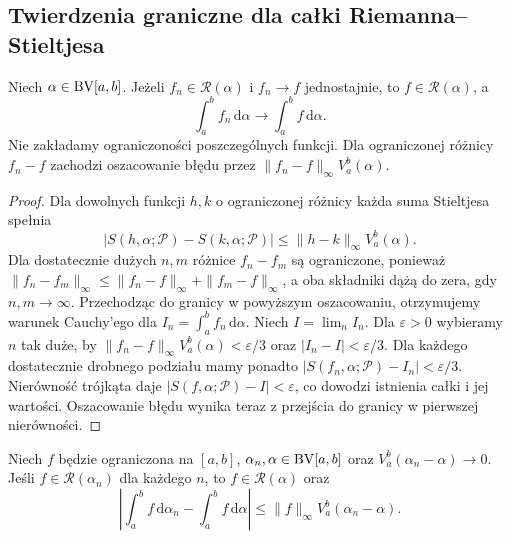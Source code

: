 \subsection{Twierdzenia graniczne dla całki Riemanna--Stieltjesa}
\begin{twierdzenie}\label{ma1:kh:thm:rs-uniform}
Niech $\alpha\in\mathrm{BV}[a,b]$. Jeżeli $f_n\in\mathcal R(\alpha)$ i $f_n\to f$ jednostajnie, to $f\in\mathcal R(\alpha)$, a
\[
 \int_a^b f_n\,\mathrm d\alpha\longrightarrow\int_a^b f\,\mathrm d\alpha.
\]
Nie zakładamy ograniczoności poszczególnych funkcji. Dla ograniczonej różnicy $f_n-f$ zachodzi oszacowanie błędu przez $\|f_n-f\|_\infty V_a^b(\alpha)$.
\end{twierdzenie}
\begin{proof}
Dla dowolnych funkcji $h,k$ o ograniczonej różnicy każda suma Stieltjesa spełnia
\[
 |S(h,\alpha;\mathcal P)-S(k,\alpha;\mathcal P)|
 \le\|h-k\|_\infty V_a^b(\alpha).
\]
Dla dostatecznie dużych $n,m$ różnice $f_n-f_m$ są ograniczone, ponieważ $\|f_n-f_m\|_\infty\le\|f_n-f\|_\infty+\|f_m-f\|_\infty$, a oba składniki dążą do zera, gdy $n,m\to\infty$. Przechodząc do granicy w powyższym oszacowaniu, otrzymujemy warunek Cauchy'ego dla $I_n=\int_a^b f_n\,\mathrm d\alpha$. Niech $I=\lim_n I_n$. Dla $\varepsilon>0$ wybieramy $n$ tak duże, by $\|f_n-f\|_\infty V_a^b(\alpha)<\varepsilon/3$ oraz $|I_n-I|<\varepsilon/3$. Dla każdego dostatecznie drobnego podziału mamy ponadto $|S(f_n,\alpha;\mathcal P)-I_n|<\varepsilon/3$. Nierówność trójkąta daje $|S(f,\alpha;\mathcal P)-I|<\varepsilon$, co dowodzi istnienia całki i jej wartości. Oszacowanie błędu wynika teraz z przejścia do granicy w pierwszej nierówności.
\end{proof}
\begin{twierdzenie}\label{ma1:kh:thm:rs-integrator-limit}
Niech $f$ będzie ograniczona na $[a,b]$, $\alpha_n,\alpha\in\mathrm{BV}[a,b]$ oraz $V_a^b(\alpha_n-\alpha)\to0$. Jeśli $f\in\mathcal R(\alpha_n)$ dla każdego $n$, to $f\in\mathcal R(\alpha)$ oraz
\[
 \left|\int_a^b f\,\mathrm d\alpha_n-\int_a^b f\,\mathrm d\alpha\right|
 \le\|f\|_\infty V_a^b(\alpha_n-\alpha).
\]
\end{twierdzenie}
